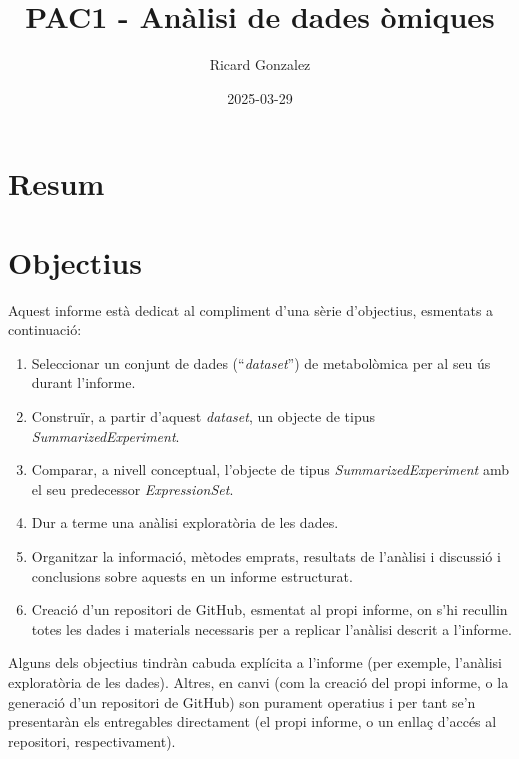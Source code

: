 \documentclass[
  a4paper]{article}
\title{PAC1 - Anàlisi de dades òmiques}
\author{Ricard Gonzalez}
\date{2025-03-29}
\renewcommand*\contentsname{Table of contents}
\newcommand\contentsname{Table of contents}
\begin{document}
\maketitle

\renewcommand*\contentsname{Índex}
{
\hypersetup{linkcolor=}
\setcounter{tocdepth}{3}
\tableofcontents
}

\newpage

\section{Resum}\label{resum}

\section{Objectius}\label{objectius}

Aquest informe està dedicat al compliment d'una sèrie d'objectius,
esmentats a continuació:

\begin{enumerate}
\def\labelenumi{\arabic{enumi}.}
\item
  Seleccionar un conjunt de dades (``\emph{dataset}'') de metabolòmica
  per al seu ús durant l'informe.
\item
  Construïr, a partir d'aquest \emph{dataset}, un objecte de tipus
  \emph{SummarizedExperiment}.
\item
  Comparar, a nivell conceptual, l'objecte de tipus
  \emph{SummarizedExperiment} amb el seu predecessor
  \emph{ExpressionSet}.
\item
  Dur a terme una anàlisi exploratòria de les dades.
\item
  Organitzar la informació, mètodes emprats, resultats de l'anàlisi i
  discussió i conclusions sobre aquests en un informe estructurat.
\item
  Creació d'un repositori de GitHub, esmentat al propi informe, on s'hi
  recullin totes les dades i materials necessaris per a replicar
  l'anàlisi descrit a l'informe.
\end{enumerate}

Alguns dels objectius tindràn cabuda explícita a l'informe (per exemple,
l'anàlisi exploratòria de les dades). Altres, en canvi (com la creació
del propi informe, o la generació d'un repositori de GitHub) son
purament operatius i per tant se'n presentaràn els entregables
directament (el propi informe, o un enllaç d'accés al repositori,
respectivament).

\pagebreak
\end{document}
